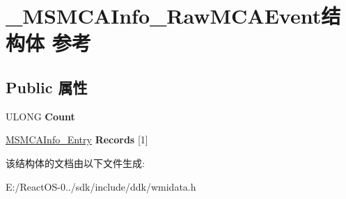 \hypertarget{struct___m_s_m_c_a_info___raw_m_c_a_event}{}\section{\+\_\+\+M\+S\+M\+C\+A\+Info\+\_\+\+Raw\+M\+C\+A\+Event结构体 参考}
\label{struct___m_s_m_c_a_info___raw_m_c_a_event}
\subsection*{Public 属性}
\begin{DoxyCompactItemize}
\item 
\mbox{\label{struct___m_s_m_c_a_info___raw_m_c_a_event_a383c6b32f932cf5008626feb4e9d0775}} 
U\+L\+O\+NG {\bfseries Count}
\item 
\mbox{\label{struct___m_s_m_c_a_info___raw_m_c_a_event_a14b1f3028c459f1d863162dda2589828}} 
\hyperlink{struct___m_s_m_c_a_info___entry}{M\+S\+M\+C\+A\+Info\+\_\+\+Entry} {\bfseries Records} \mbox{[}1\mbox{]}
\end{DoxyCompactItemize}


该结构体的文档由以下文件生成\+:\begin{DoxyCompactItemize}
\item 
E\+:/\+React\+O\+S-\/0../sdk/include/ddk/wmidata.\+h\end{DoxyCompactItemize}
